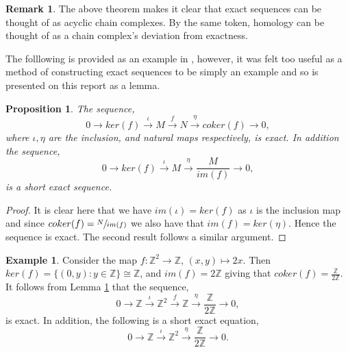 \documentclass[11.5pt, twoside, a4paper, titlepage]{report}
\providecommand{\bb}[1]{\mathbb{#1}}
\theoremstyle{definition}
\newtheorem{rem}[mydef]{Remark}
\newtheorem{eg}[mydef]{Example}
\theoremstyle{plain}
\newtheorem{prop}[mydef]{Proposition}
\begin{document}
\begin{rem}
The above theorem makes it clear that exact sequences can be thought of as acyclic chain complexes. By the same token, homology can be thought of as a chain complex's deviation from exactness.
\end{rem}

The folllowing is provided as an example in \cite{Schiff}, however, it was felt too useful as a method of constructing exact sequences to be simply an example and so is presented on this report as a lemma.

\begin{prop} \label{cokerseqprop}
The sequence,
\begin{equation*}
0 \xrightarrow{} ker(f) \xrightarrow{\iota} M \xrightarrow{f} N \xrightarrow{\eta} coker(f) \xrightarrow{} 0,
\end{equation*} 
where $\iota , \eta$ are the inclusion, and natural maps respectively, is exact. In addition the sequence, 
\begin{equation*}
0\xrightarrow{} ker(f) \xrightarrow{\iota} M \xrightarrow{\eta} \frac{M}{im(f)} \xrightarrow{} 0,
\end{equation*}
is a short exact sequence.
\end{prop}
\begin{proof}
It is clear here that we have $im(\iota)=ker(f)$ as $\iota$ is the inclusion map and since $coker(f)=\sfrac{N}{im(f)}$ we also have that $im(f)=ker(\eta)$. Hence the sequence is exact. The second result follows a similar argument.
\end{proof}

\begin{eg}
Consider the map $f:\bb{Z}^2 \to \bb{Z}$, $(x, y)\mapsto 2x$. Then $ker(f)=\{(0,y):y\in \bb{Z}\}\cong \bb{Z}$, and $im(f)=2\bb{Z}$ giving that $coker(f)=\frac{\bb{Z}}{2\bb{Z}}$. It follows from Lemma \ref{cokerseqprop} that the sequence, 
\begin{equation*}
0 \xrightarrow{} \bb{Z} \xrightarrow{\iota} \bb{Z}^2 \xrightarrow{f} \bb{Z} \xrightarrow{\eta} \frac{\bb{Z}}{2\bb{Z}} \xrightarrow{} 0,
\end{equation*}
is exact. In addition, the following is a short exact equation,
\begin{equation*}
0\xrightarrow{} \bb{Z} \xrightarrow{\iota} \bb{Z}^2 \xrightarrow{\eta} \frac{\bb{Z}}{2\bb{Z}} \xrightarrow{}0.
\end{equation*}
\end{eg}
\end{document}
